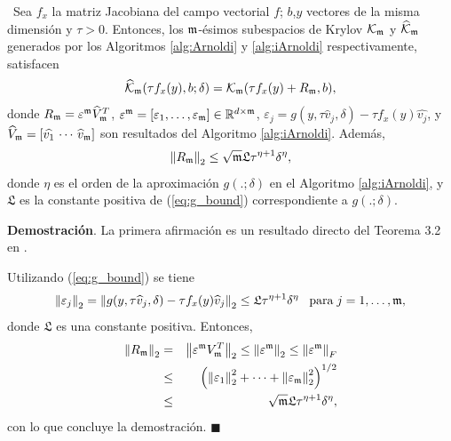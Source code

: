 \begin{theorem} \label{theorem:krilobapproxequality} \cite{naranjo2023jacobian}~Sea $f_x$ la matriz Jacobiana del campo vectorial $f$; $b$,$y$ vectores de la misma dimensión y $\tau>0$. Entonces, los $\mathfrak{m}$-ésimos subespacios de Krylov $\mathcal{K}_{\mathfrak{m}}$ y $\widehat{\mathcal{K}}_{\mathfrak{m}}$ generados por los Algoritmos \ref{alg:Arnoldi} y \ref{alg:iArnoldi} respectivamente, satisfacen 
	\[ \widehat{\mathcal{K}}_{\mathfrak{m}}(\tau f_x(y),b;\delta) = \mathcal{K}_{\mathfrak{m}}(\tau f_x(y)+R_{\mathfrak{m}},b), \]
	donde $R_{\mathfrak{m}} =  \varepsilon^{\mathfrak{m}}\widehat{V}^T_{\mathfrak{m}}$,  
	$\varepsilon^{\mathfrak{m}} = [\varepsilon_1,\dots,\varepsilon_{\mathfrak{m}}] \in \mathbb{R}^{d\times \mathfrak{m}}$, $\varepsilon_j = g(y,\tau\widehat{v}_j,\delta)- \tau f_x(y)\widehat{v_j}$, y $\widehat{V}_{\mathfrak{m}}=[\widehat{v_1}\,\cdots \,\widehat{v}_{\mathfrak{m}}]$ son resultados del Algoritmo \ref{alg:iArnoldi}. Además, 
	\[ \left\lVert R_{\mathfrak{m}} \right\rVert_2\leq \sqrt{\mathfrak{m}}\mathfrak{L} \tau^{\eta+1}\delta^{\eta}, \]
	donde $\eta$ es el orden de la aproximación $g(.;\delta)$ en el Algoritmo \ref{alg:iArnoldi}, y $\mathfrak{L}$ es la constante positiva de (\ref{eq:g_bound}) correspondiente a $g(.;\delta)$.
\end{theorem}
\textbf{Demostración}. La primera afirmación es un resultado directo del Teorema 3.2 en \cite{brown1987local}.

Utilizando  (\ref{eq:g_bound}) se tiene
\[ \left\lVert \varepsilon_j \right\rVert_2=\left\lVert g(y,\tau\widehat{v}_j,\delta)-\tau f_x(y)\widehat{v}_j \right\rVert_2 \leq  \mathfrak{L} \tau^{\eta+1}\delta^{\eta}\;\;\;\text{para}\;j=1,\dots,\mathfrak{m}, \]
donde $\mathfrak{L}$ es una constante positiva. Entonces, 
\begin{eqnarray*}
	\left\lVert R_{\mathfrak{m}} \right\rVert_2 & = & \left\lVert \varepsilon^{\mathfrak{m}} V_{\mathfrak{m}}^T \right\rVert_2\leq\left\lVert \varepsilon^{\mathfrak{m}} \right\rVert_2\leq \left\lVert \varepsilon^{\mathfrak{m}} \right\rVert_F \\
	& \leq & \left( \left\lVert \varepsilon_1 \right\rVert_2^2 + \cdots + \left\lVert \varepsilon_{\mathfrak{m}} \right\rVert_2^2 \right)^{1/2} \\
	& \leq & \sqrt{\mathfrak{m}}\mathfrak{L} \tau^{\eta+1}\delta^{\eta},
\end{eqnarray*}
con lo que concluye la demostración. $\blacksquare$\\

